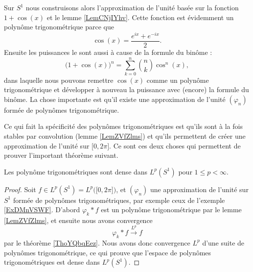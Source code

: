 \begin{example} \label{ExDMnVSWF}
    Sur \( S^1\) nous construisons alors l'approximation de l'unité basée sur la fonction \( 1+\cos(x)\) et le lemme \ref{LemCNjIYhv}. Cette fonction est évidemment un polynôme trigonométrique parce que 
    \begin{equation}
        \cos(x)=\frac{  e^{ix}+ e^{-ix} }{2}.
    \end{equation}
    Ensuite les puissances le sont aussi à cause de la formule du binôme :
    \begin{equation}
        \big( 1+\cos(x) \big)^n=\sum_{k=0}^n\binom{ n }{ k }\cos^n(x),
    \end{equation}
    dans laquelle nous pouvons remettre \( \cos(x)\) comme un polynôme trigonométrique et développer à nouveau la puissance avec (encore) la formule du binôme. La chose importante est qu'il existe une approximation de l'unité \( (\varphi_n)\) formée de polynômes trigonométrique.

    Ce qui fait la spécificité des polynômes trigonométriques est qu'ils sont à la fois stables par convolution (lemme \ref{LemZVfZlms}) et qu'ils permettent de créer une approximation de l'unité sur \( \mathopen[ 0 , 2\pi \mathclose]\). Ce sont ces deux choses qui permettent de prouver l'important théorème suivant.
\end{example}

\begin{theorem} \label{ThoQGPSSJq}
    Les polynôme trigonométriques sont dense dans \( L^p(S^1)\) pour \( 1\leq p<\infty\).
\end{theorem}

\begin{proof}
    Soit \( f\in L^p(S^1)=L^p\big( \mathopen[ 0 , 2\pi \mathclose] \big)\), et \( (\varphi_n)\) une approximation de l'unité sur \( S^1\) formée de polynômes trigonométriques, par exemple ceux de l'exemple \ref{ExDMnVSWF}. D'abord \( \varphi_k*f\) est un polynôme trigonométrique par le lemme \ref{LemZVfZlms}, et ensuite nous avons convergence
    \begin{equation}
        \varphi_k*f\stackrel{L^p}{\to}f
    \end{equation}
    par le théorème \ref{ThoYQbqEez}. Nous avons donc convergence \( L^p\) d'une suite de polynômes trigonométrique, ce qui prouve que l'espace de polynômes trigonométriques est dense dans \( L^p(S^1)\).
\end{proof}

